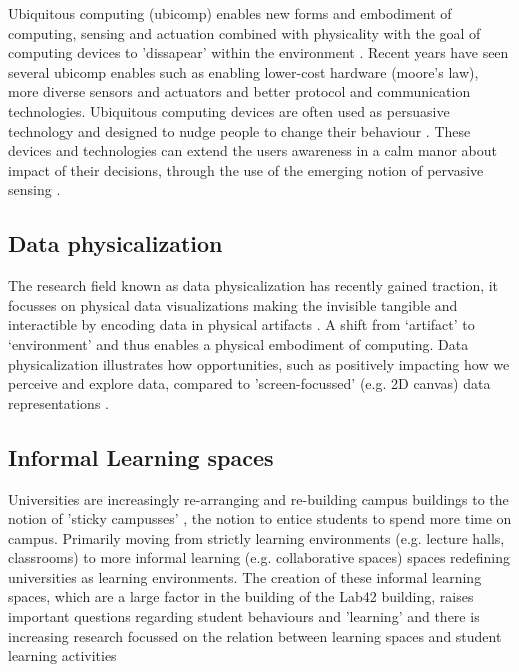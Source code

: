 Ubiquitous computing (ubicomp) enables new forms and embodiment of computing, sensing and actuation combined with physicality with the goal of computing devices to 'dissapear' within the environment \cite{weiser}. Recent years have seen several ubicomp enables such as enabling lower-cost hardware (moore’s law), more diverse sensors and actuators and better protocol and communication technologies. Ubiquitous computing devices are often used as persuasive technology and designed to nudge people to change their behaviour \cite{twinkly}. These devices and technologies can extend the users awareness in a calm manor about impact of their decisions, through the use of the emerging notion of pervasive sensing \cite{calm}.

\subsection{Data physicalization}

The research field known as data physicalization has recently gained traction, it focusses on physical data visualizations making the invisible tangible and interactible by encoding data in physical artifacts \cite{tangible}. A shift from ‘artifact’ to ‘environment’ and thus enables a physical embodiment of computing. Data physicalization illustrates how opportunities, such as positively impacting how we perceive and explore data, compared to  'screen-focussed' (e.g. 2D canvas) data representations \cite{physicalization}.

\subsection{Informal Learning spaces}

Universities are increasingly re-arranging and re-building campus buildings to the notion of 'sticky campusses' \cite{sticky}, the notion to entice students to spend more time on campus. Primarily moving from strictly learning environments (e.g. lecture halls, classrooms) to more informal learning (e.g. collaborative spaces) spaces redefining universities as learning environments. The creation of these informal learning spaces, which are a large factor in the building of the Lab42 building, raises important questions regarding student behaviours and 'learning'\cite{critical} and there is increasing research focussed on the relation between learning spaces and student learning activities \cite{learning}